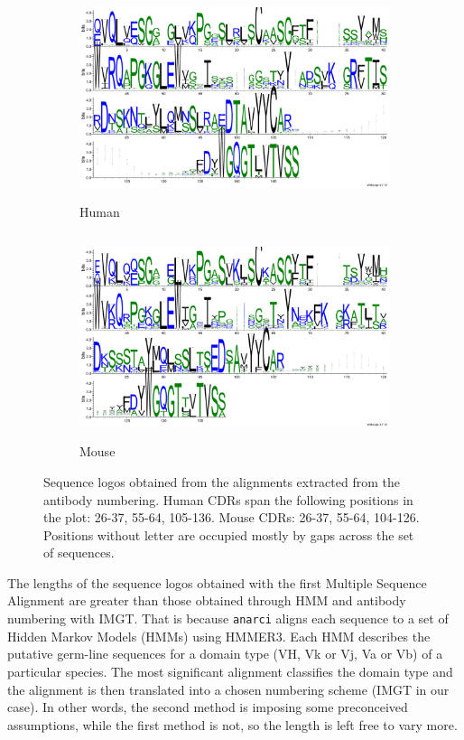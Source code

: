 \documentclass[11pt]{article}
\begin{document}
\begin{figure}[h]
	
	\begin{subfigure}{0.5\textwidth}
		\includegraphics[width=0.9\linewidth, height=6cm]{images/human_hmm_align_logo.pdf} 
		\caption{Human}
	\end{subfigure}
	\begin{subfigure}{0.5\textwidth}
		\includegraphics[width=0.9\linewidth, height=6cm]{images/mouse_hmm_align_logo.pdf}
		\caption{Mouse}
	\end{subfigure}
	
	\caption{\small Sequence logos obtained from the alignments extracted from the antibody numbering. Human CDRs span the following positions in the plot: 26-37, 55-64, 105-136. Mouse CDRs: 26-37, 55-64, 104-126. Positions without letter are occupied mostly by gaps across the set of sequences.}
	\label{fig:image2}
\end{figure}

The lengths of the sequence logos obtained with the first Multiple Sequence Alignment are greater than those obtained through HMM and antibody numbering with IMGT. That is because \verb|anarci| aligns each sequence to a set of Hidden Markov Models (HMMs) using HMMER3. Each HMM describes the putative germ-line sequences for a domain type (VH, Vk or Vj, Va or Vb) of a particular species. The most significant alignment classifies the domain type and the alignment is then translated into a chosen numbering scheme (IMGT in our case). In other words, the second method is imposing some preconceived assumptions, while the first method is not, so the length is left free to vary more.
\end{document}
